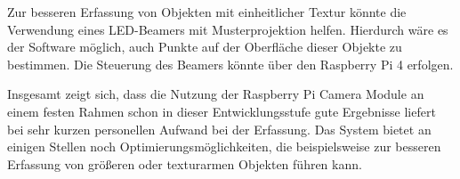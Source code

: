 \documentclass[./00PhotoBox.tex]{subfiles}
\begin{document}
Zur besseren Erfassung von Objekten mit einheitlicher Textur könnte die Verwendung eines LED-Beamers mit Musterprojektion helfen. Hierdurch wäre es der Software möglich, auch Punkte auf der Oberfläche dieser Objekte zu bestimmen. Die Steuerung des Beamers könnte über den Raspberry Pi 4 erfolgen.


Insgesamt zeigt sich, dass die Nutzung der Raspberry Pi Camera Module an einem festen Rahmen schon in dieser Entwicklungsstufe gute Ergebnisse liefert bei sehr kurzen personellen Aufwand bei der Erfassung. Das System bietet an einigen Stellen noch Optimierungsmöglichkeiten, die beispielsweise zur besseren Erfassung von größeren oder texturarmen Objekten führen kann.


\biblio
\end{document}
